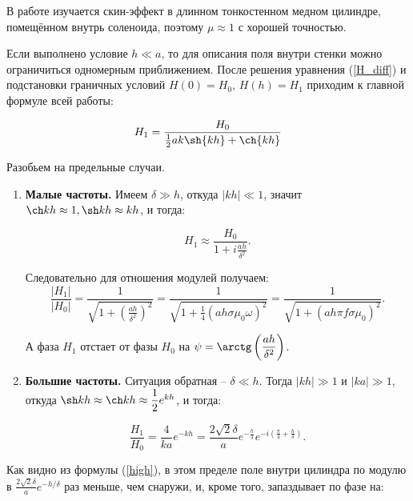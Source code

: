 \documentclass[a4paper, 12pt]{article} %
\begin{document}
В работе изучается скин-эффект в длинном тонкостенном медном цилиндре, помещённом внутрь соленоида, поэтому $\mu \approx 1$ с хорошей точностью.
	
	Если выполнено условие $h \ll a$, то для описания поля внутри стенки можно ограничиться одномерным приближением. После решения уравнения (\ref{H_diff}) и подстановки граничных условий $H(0) = H_0$, $H(h) = H_1$ приходим к главной формуле всей работы:
	
	\begin{equation}
		H_{1} = \dfrac{H_0}{\frac{1}{2}ak \sh{k h} + \ch{k h}}
	\end{equation}

	Разобьем на предельные случаи.
	
	\begin{enumerate}
		\item \textbf{Малые частоты.}
			Имеем $\delta \gg h$, откуда $|kh| \ll 1$, значит $\ch kh \approx 1, \sh kh \approx kh$, и тогда:
			
			\begin{equation}
				H_1 \approx \dfrac{H_0}{1 + i\frac{ah}{\delta^2}}.
			\end{equation}
		
			Следовательно для отношения модулей получаем:
			\begin{equation}
				\dfrac{|H_1|}{|H_0|} = \dfrac{1}{\sqrt{1+ \left(\frac{ah}{\delta^2}\right)^2}} = \dfrac{1}{\sqrt{1 + \frac{1}{4}\left(ah\sigma\mu_0\omega\right)^2}} = \dfrac{1}{\sqrt{1 + \left(ah\pi f\sigma\mu_0\right)^2}}.
			\end{equation}
		
		 	А фаза $H_1$ отстает от фазы $H_0$ на $\psi = \arctg\left(\dfrac{ah}{\delta^2}\right)$.
		 	
		 \item \textbf{Большие частоты.} 
		 	Ситуация обратная -- $\delta \ll h$. Тогда $|kh| \gg 1$ и 	$|ka| \gg 1$, откуда $\sh kh \approx \ch kh \approx \dfrac{1}{2}e^{kh}$, и тогда:
		 
		 	\Large
			\begin{equation}
			 	\frac{H_1}{H_0} = \frac{4}{ka}e^{-kh} = \frac{2\sqrt{2}\delta}{a}e^{-\frac{h}{\delta}}e^{-i\left(\frac{\pi}{4} + \frac{h}{\delta}\right)}.
			 	\label{high}
			\end{equation}
	\end{enumerate}
	

	
	Как видно из формулы (\ref{high}), в этом пределе поле внутри цилиндра по модулю в $\frac{2\sqrt{2}\delta}{a}e^{-h/\delta}$ раз меньше, чем снаружи, и, кроме того, запаздывает по фазе на:
	
\end{document}

